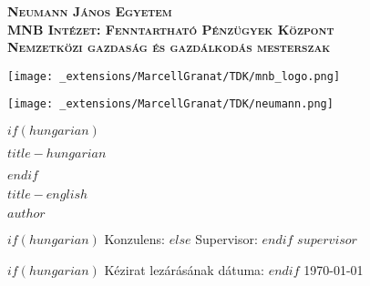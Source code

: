 \begin{titlepage}
\clearpage
\thispagestyle{empty}
\vspace*{0.1cm}
\begin{center}
    
    {\bfseries\fontsize{16}{22}\selectfont \textsc{Neumann János Egyetem}} \\ {\bfseries\fontsize{16}{22}\selectfont \textsc{MNB Intézet: Fenntartható Pénzügyek Központ }} \\ {\bfseries\fontsize{16}{22}\selectfont \textsc{Nemzetközi gazdaság és gazdálkodás mesterszak}}
\end{center}
\vspace*{1cm}
\begin{center}
   \texttt{[image: \_extensions/MarcellGranat/TDK/mnb\_logo.png]}

\end{center}
\vspace*{1cm}
\begin{center}
   \texttt{[image: \_extensions/MarcellGranat/TDK/neumann.png]}

\end{center}
$if(hungarian)$
\vspace*{1cm}
\begin{center}
    
    {\bfseries\fontsize{18}{22}\selectfont \textsc{$title-hungarian$}}
\end{center}

$endif$

\vspace*{1cm}
\begin{center}
    
    {\bfseries\fontsize{18}{22}\selectfont \textsc{$title-english$}}
\end{center}

\vspace*{1cm}
\begin{center}
    
    {\fontsize{16}{22}\selectfont \textsc{$author$}}

\end{center}

\vspace*{3cm}
\begin{center}
    
    {\fontsize{16}{22}\selectfont 
    $if(hungarian)$
    Konzulens: 
    $else$
    Supervisor:
    $endif$
    $supervisor$}
\end{center}


\begin{center}
    \vspace*{\fill}
    {\fontsize{14}{20}\selectfont 
    $if(hungarian)$
    Kézirat lezárásának dátuma:
    $endif$
    \today}
\end{center}
\end{titlepage}

